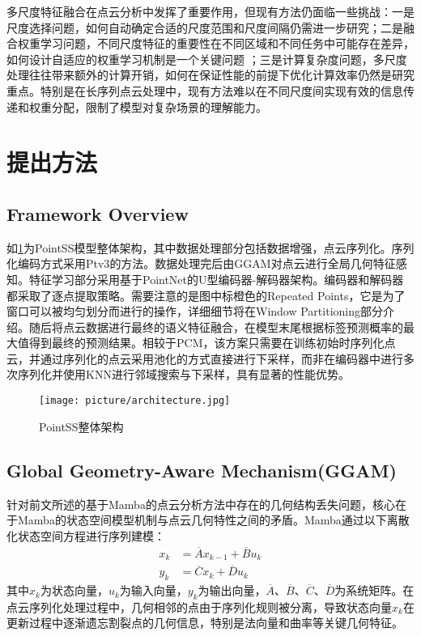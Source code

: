 \documentclass[preprint,12pt]{elsarticle}
\begin{document}
多尺度特征融合在点云分析中发挥了重要作用，但现有方法仍面临一些挑战\cite{multiscale_survey_2024}：一是尺度选择问题，如何自动确定合适的尺度范围和尺度间隔仍需进一步研究；二是融合权重学习问题，不同尺度特征的重要性在不同区域和不同任务中可能存在差异，如何设计自适应的权重学习机制是一个关键问题     
；三是计算复杂度问题，多尺度处理往往带来额外的计算开销，如何在保证性能的前提下优化计算效率仍然是研究重点。特别是在长序列点云处理中，现有方法难以在不同尺度间实现有效的信息传递和权重分配，限制了模型对复杂场景的理解能力。






\section{提出方法}

\subsection{ Framework Overview}
如\cref{fig:architecture}为PointSS模型整体架构，其中数据处理部分包括数据增强，点云序列化。序列化编码方式采用Ptv3\cite{ptv3}的方法。数据处理完后由GGAM对点云进行全局几何特征感知。特征学习部分采用基于PointNet的U型编码器-解码器架构。编码器和解码器都采取了逐点提取策略。需要注意的是图中标橙色的Repeated Points，它是为了窗口可以被均匀划分而进行的操作，详细细节将在Window Partitioning部分介绍。随后将点云数据进行最终的语义特征融合，在模型末尾根据标签预测概率的最大值得到最终的预测结果。相较于PCM，该方案只需要在训练初始时序列化点云，并通过序列化的点云采用池化的方式直接进行下采样，而非在编码器中进行多次序列化并使用KNN进行邻域搜索与下采样，具有显著的性能优势。
\begin{figure}[htbp]
	\centering
	\texttt{[image: picture/architecture.jpg]}
	\caption{PointSS整体架构}
	\label{fig:architecture}
\end{figure}


\subsection{Global Geometry-Aware Mechanism(GGAM)}


针对前文所述的基于Mamba的点云分析方法中存在的几何结构丢失问题，核心在于Mamba的状态空间模型机制与点云几何特性之间的矛盾。Mamba通过以下离散化状态空间方程进行序列建模：
\begin{equation}
\begin{aligned}
x_{k} &= \overline{A}x_{k-1} + \overline{B}u_{k} \\
y_{k} &= \overline{C}x_{k} + \overline{D}u_{k}
\end{aligned}
\end{equation}
其中$x_k$为状态向量，$u_k$为输入向量，$y_k$为输出向量，$\overline{A}$、$\overline{B}$、$\overline{C}$、$\overline{D}$为系统矩阵。在点云序列化处理过程中，几何相邻的点由于序列化规则被分离，导致状态向量$x_k$在更新过程中逐渐遗忘割裂点的几何信息，特别是法向量和曲率等关键几何特征。
\end{document}

